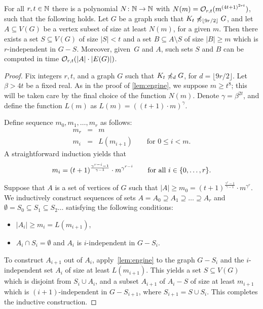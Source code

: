  \setcounter{aux}{\thetheorem}
 \setcounter{theorem}{\theuqw}
 \begin{theorem}
 For all $r,t\in \mathbb{N}$ there is a polynomial  $N\colon \mathbb{N}\to \mathbb{N}$ with $N(m)=
 \mathcal{O}_{r,t}{(m^{{(4t+1)}^{2rt}})}$, such that the following holds.
 Let $G$ be a graph such that $K_t\not\preccurlyeq_{\lfloor 9r/2\rfloor} G$, and
 let $A\subseteq V(G)$ be a vertex subset of size at least $N(m)$, for a given $m$.
 Then there exists a set $S\subseteq V(G)$ of size $|S|<t$ and a set $B\subseteq A\setminus S$
 of size $|B|\geq m$ which is $r$-independent in $G-S$.
 Moreover, given~$G$ and $A$, such sets $S$ and $B$ can be computed in time $\mathcal{O}_{r,t}(|A|\cdot |E(G)|)$.
 \end{theorem}
 \setcounter{theorem}{\theaux}
\begin{proof}
Fix integers $r,t$,  and a graph $G$ such that $K_t\not\preccurlyeq_{d} G$,
for $d=\lfloor 9r/2 \rfloor$. Let $\beta>4t$ be a fixed real. As in the proof of \cref{lem:engine}, we suppose $m\geq t^8$; this will be taken care by the final choice of the function $N(m)$.
Denote $\gamma=\beta^{2t}$, and
define the function $L(m)$ as $L(m)=((t+1)\cdot m)^\gamma$.

Define sequence $m_0,m_1,\ldots,m_r$ as follows:
\begin{eqnarray*}
m_r & = & m\\
m_i & = & L(m_{i+1}) \qquad \textrm{for }0\leq i<m.
\end{eqnarray*}
A straightforward induction yields that 
\begin{equation*}
m_i=(t+1)^{\frac{\gamma^{r-i}-1}{\gamma-1}}\cdot m^{\gamma^{r-i}}\qquad \textrm{for all }i\in \{0,\ldots,r\}.
\end{equation*}

Suppose that $A$ is a set of vertices of $G$ such that $|A|\ge m_0=(t+1)^{\frac{\gamma^{r}-1}{\gamma-1}}\cdot m^{\gamma^{r}}$. 
We inductively construct sequences of sets $A= A_0\supseteq A_1\supseteq \ldots \supseteq A_r$ and $\emptyset=S_0\subseteq S_1\subseteq S_2\ldots$
satisfying the following conditions:
\begin{itemize}
	\item $|A_i|\ge m_i=L(m_{i+1})$,
	\item $A_i\cap S_i=\emptyset$ and $A_i$ is $i$-independent in $G-S_i$.
\end{itemize}
To construct $A_{i+1}$ out of $A_i$, apply~\cref{lem:engine} to the graph $G-S_i$ and 
the $i$-independent set $A_i$ of size at least $L(m_{i+1})$. This yields a set $S\subseteq V(G)$ which is disjoint from $S_i\cup A_i$, and a subset $A_{i+1}$ of $A_i-S$ of size 
at least $m_{i+1}$
which is $(i+1)$-independent in $G-S_{i+1}$, where $S_{i+1}=S\cup S_i$. This completes the inductive construction.


\end{proof}
